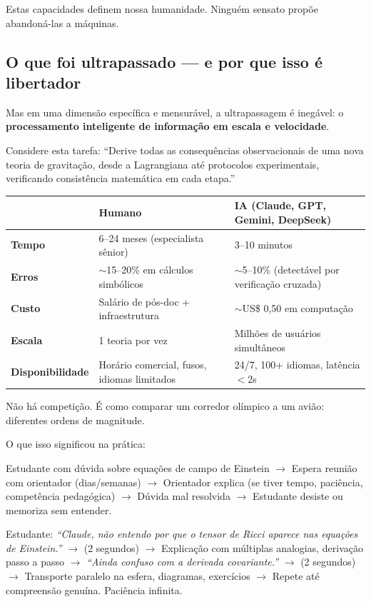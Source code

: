 \documentclass[12pt, a4paper]{article}
\begin{document}
Estas capacidades definem nossa humanidade. Ninguém sensato propõe abandoná-las a máquinas.

\subsection{O que foi ultrapassado --- e por que isso é libertador}\label{sec:ultrapassado}

Mas em uma dimensão específica e mensurável, a ultrapassagem é inegável: o \textbf{processamento inteligente de informação em escala e velocidade}.

Considere esta tarefa: ``Derive todas as consequências observacionais de uma nova teoria de gravitação, desde a Lagrangiana até protocolos experimentais, verificando consistência matemática em cada etapa.''

\begin{center}
\begin{tabularx}{\textwidth}{>{\bfseries}l X X}
\toprule
 & \textbf{Humano} & \textbf{IA (Claude, GPT, Gemini, DeepSeek)} \\
\midrule
Tempo & 6--24 meses (especialista sênior) & 3--10 minutos \\
Erros & $\sim$15--20\% em cálculos simbólicos & $\sim$5--10\% (detectável por verificação cruzada) \\
Custo & Salário de pós-doc + infraestrutura & $\sim$US\$ 0,50 em computação \\
Escala & 1 teoria por vez & Milhões de usuários simultâneos \\
Disponibilidade & Horário comercial, fusos, idiomas limitados & 24/7, 100+ idiomas, latência $<$2s \\
\bottomrule
\end{tabularx}
\end{center}

Não há competição. É como comparar um corredor olímpico a um avião: diferentes ordens de magnitude.

O que isso significou na prática:

\begin{reflexao}
Estudante com dúvida sobre equações de campo de Einstein $\to$ Espera reunião com orientador (dias/semanas) $\to$ Orientador explica (se tiver tempo, paciência, competência pedagógica) $\to$ Dúvida mal resolvida $\to$ Estudante desiste ou memoriza sem entender.
\end{reflexao}

\begin{reflexao}
Estudante: \textit{``Claude, não entendo por que o tensor de Ricci aparece nas equações de Einstein.''} $\to$ (2 segundos) $\to$ Explicação com múltiplas analogias, derivação passo a passo $\to$ \textit{``Ainda confuso com a derivada covariante.''} $\to$ (2 segundos) $\to$ Transporte paralelo na esfera, diagramas, exercícios $\to$ Repete até compreensão genuína. Paciência infinita.
\end{reflexao}
\end{document}
